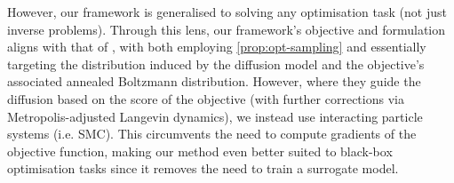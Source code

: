However, our framework is generalised to solving any optimisation task (not just inverse problems).
Through this lens, our framework's objective and formulation aligns with that of
\cite{kongDiffusionModelsConstrained2024}, with both employing \autoref{prop:opt-sampling} and
essentially targeting the distribution induced by the diffusion model and the objective's
associated annealed Boltzmann distribution. However, where they guide the diffusion based on the
score of the objective (with further corrections via Metropolis-adjusted Langevin dynamics), we
instead use interacting particle systems (i.e. SMC). This circumvents the need to compute gradients
of the objective function, making our method even better suited to black-box optimisation tasks
since it removes the need to train a surrogate model.
